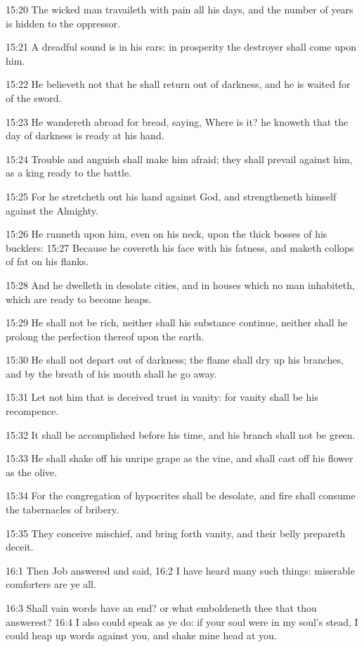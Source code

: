 15:20 The wicked man travaileth with pain all his days, and the number of years is hidden to the oppressor.

15:21 A dreadful sound is in his ears: in prosperity the destroyer shall come upon him.

15:22 He believeth not that he shall return out of darkness, and he is waited for of the sword.

15:23 He wandereth abroad for bread, saying, Where is it? he knoweth that the day of darkness is ready at his hand.

15:24 Trouble and anguish shall make him afraid; they shall prevail against him, as a king ready to the battle.

15:25 For he stretcheth out his hand against God, and strengtheneth himself against the Almighty.

15:26 He runneth upon him, even on his neck, upon the thick bosses of his bucklers: 15:27 Because he covereth his face with his fatness, and maketh collops of fat on his flanks.

15:28 And he dwelleth in desolate cities, and in houses which no man inhabiteth, which are ready to become heaps.

15:29 He shall not be rich, neither shall his substance continue, neither shall he prolong the perfection thereof upon the earth.

15:30 He shall not depart out of darkness; the flame shall dry up his branches, and by the breath of his mouth shall he go away.

15:31 Let not him that is deceived trust in vanity: for vanity shall be his recompence.

15:32 It shall be accomplished before his time, and his branch shall not be green.

15:33 He shall shake off his unripe grape as the vine, and shall cast off his flower as the olive.

15:34 For the congregation of hypocrites shall be desolate, and fire shall consume the tabernacles of bribery.

15:35 They conceive mischief, and bring forth vanity, and their belly prepareth deceit.

16:1 Then Job answered and said, 16:2 I have heard many such things: miserable comforters are ye all.

16:3 Shall vain words have an end? or what emboldeneth thee that thou answerest?  16:4 I also could speak as ye do: if your soul were in my soul's stead, I could heap up words against you, and shake mine head at you.

